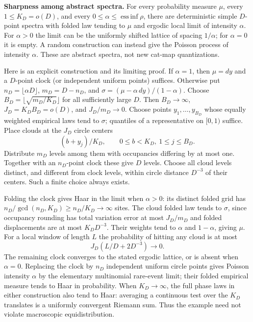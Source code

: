 \textbf{Sharpness among abstract spectra.} For every probability measure \(\mu\),
every \(1\le K_D=o(D)\), and every \(0\le\alpha\le\operatorname*{ess\,inf}\rho\),
there are deterministic simple \(D\)-point spectra with folded law tending to
\(\mu\) and ergodic local limit of intensity \(\alpha\). For \(\alpha>0\) the limit
can be the uniformly shifted lattice of spacing \(1/\alpha\); for \(\alpha=0\)
it is empty. A random construction can instead give the Poisson process of
intensity \(\alpha\). These are abstract spectra, not new cat-map quantizations.

Here is an explicit construction and its limiting proof. If \(\alpha=1\),
then \(\mu=dy\) and a \(D\)-point clock (or independent uniform points) suffices.
Otherwise put
\(n_D=\lfloor\alpha D\rfloor\), \(m_D=D-n_D\), and
\(\sigma=(\mu-\alpha\,dy)/(1-\alpha)\).
Choose \(B_D=\lfloor\sqrt{m_D/K_D}\rfloor\) for all sufficiently large \(D\).
Then \(B_D\to\infty\), \(J_D=K_DB_D=o(D)\), and \(J_D/m_D\to0\).
Choose points \(y_1,\ldots,y_{B_D}\) whose equally weighted empirical laws
tend to \(\sigma\); quantiles of a representative on \([0,1)\) suffice.
Place clouds at the \(J_D\) circle centers
\[
             (b+y_j)/K_D,\qquad 0\le b<K_D,\ 1\le j\le B_D.
\]
Distribute \(m_D\) levels among them with occupancies differing by at most one.
Together with an \(n_D\)-point clock these give \(D\) levels. Choose all cloud
levels distinct, and different from clock levels, within circle distance
\(D^{-3}\) of their centers. Such a finite choice always exists.

Folding the clock gives Haar in the limit when \(\alpha>0\): its distinct
folded grid has \(n_D/\gcd(n_D,K_D)\ge n_D/K_D\to\infty\) sites.
The cloud folded law tends to \(\sigma\), since occupancy rounding has total
variation error at most \(J_D/m_D\) and folded displacements are at most
\(K_DD^{-3}\). Their weights tend to \(\alpha\) and \(1-\alpha\), giving \(\mu\).
For a local window of length \(L\) the probability of hitting any cloud is
at most
\[
                       J_D(L/D+2D^{-3})\longrightarrow0.        \tag{Ret.S23}
\]
The remaining clock converges to the stated ergodic lattice, or is absent
when \(\alpha=0\). Replacing the clock by \(n_D\) independent uniform circle
points gives Poisson intensity \(\alpha\) by the elementary multinomial
rare-event limit; their folded empirical measure tends to Haar in probability.
When \(K_D\to\infty\), the full phase laws in either construction also tend to
Haar: averaging a continuous test over the \(K_D\) translates is a uniformly
convergent Riemann sum. Thus the example need not violate macroscopic
equidistribution.

